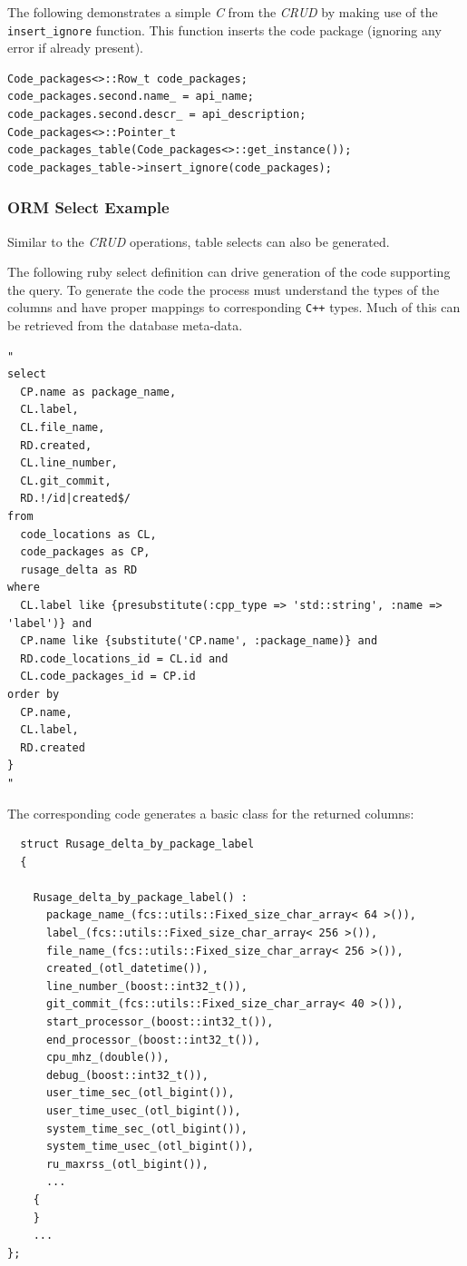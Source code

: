 \documentclass[11pt]{article}
\begin{document}
\begin{itemize}
     The following demonstrates a simple \emph{C} from the \emph{CRUD} by making
     use of the \texttt{insert\_ignore} function. This function inserts the
     code package (ignoring any error if already present).


\lstset{language=C++}
\begin{lstlisting}
Code_packages<>::Row_t code_packages;
code_packages.second.name_ = api_name;
code_packages.second.descr_ = api_description;
Code_packages<>::Pointer_t code_packages_table(Code_packages<>::get_instance());
code_packages_table->insert_ignore(code_packages);
\end{lstlisting}



\end{itemize} %
\subsubsection{ORM Select Example}
\label{sec-4.2.2}

    
    Similar to the \emph{CRUD} operations, table selects can also be
    generated.

    The following ruby select definition can drive generation of the
    code supporting the query. To generate the code the process must
    understand the types of the columns and have proper mappings to
    corresponding \texttt{C++} types. Much of this can be retrieved from the
    database meta-data.


\lstset{language=Ruby}
\begin{lstlisting}
"
select 
  CP.name as package_name,
  CL.label,
  CL.file_name,
  RD.created,
  CL.line_number,
  CL.git_commit,
  RD.!/id|created$/
from 
  code_locations as CL, 
  code_packages as CP,
  rusage_delta as RD
where  
  CL.label like {presubstitute(:cpp_type => 'std::string', :name => 'label')} and
  CP.name like {substitute('CP.name', :package_name)} and
  RD.code_locations_id = CL.id and
  CL.code_packages_id = CP.id
order by
  CP.name,
  CL.label,
  RD.created
}
"
\end{lstlisting}



\pagebreak
    The corresponding code generates a basic class for the returned columns:

\lstset{language=C++}
\begin{lstlisting}
  struct Rusage_delta_by_package_label 
  {

    Rusage_delta_by_package_label() :
      package_name_(fcs::utils::Fixed_size_char_array< 64 >()),
      label_(fcs::utils::Fixed_size_char_array< 256 >()),
      file_name_(fcs::utils::Fixed_size_char_array< 256 >()),
      created_(otl_datetime()),
      line_number_(boost::int32_t()),
      git_commit_(fcs::utils::Fixed_size_char_array< 40 >()),
      start_processor_(boost::int32_t()),
      end_processor_(boost::int32_t()),
      cpu_mhz_(double()),
      debug_(boost::int32_t()),
      user_time_sec_(otl_bigint()),
      user_time_usec_(otl_bigint()),
      system_time_sec_(otl_bigint()),
      system_time_usec_(otl_bigint()),
      ru_maxrss_(otl_bigint()),
      ...
    {
    }
    ...
};
\end{lstlisting}
\end{document}
